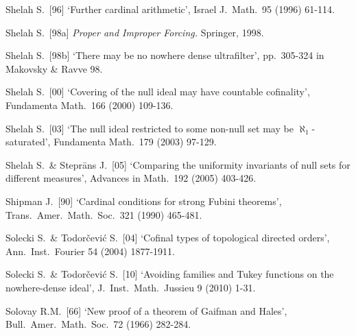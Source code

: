 {Shelah S.\ [96] `Further cardinal arithmetic', Israel J.\ Math.\ 95
(1996) 61-114.
\cmmnt{[542I.]}

Shelah S.\ [98a] {\it Proper and Improper Forcing.}  Springer, 1998.

Shelah S.\ [98b] `There may be no nowhere dense ultrafilter', pp.\ 305-324
in {\smc Makovsky \& Ravve 98}.
\cmmnt{[538H, \S538 {\it notes\/}.]}


Shelah S.\ [00] `Covering of the null ideal may have countable
cofinality', Fundamenta Math.\ 166 (2000) 109-136.
\cmmnt{[\S522 {\it notes\/}.]}

Shelah S.\ [03] `The null ideal restricted to some non-null set may be
$\aleph_1$-saturated',  Fundamenta Math.\ 179 (2003) 97-129.
\cmmnt{[\S547 {\it notes\/}.]}


Shelah S.\ \& Stepr\=ans J.\ [05]
`Comparing the uniformity invariants of null sets for different measures',
Advances in Math.\ 192 (2005) 403-426.
\cmmnt{[534Za.]}


Shipman J.\ [90] `Cardinal conditions for strong Fubini
theorems', Trans.\ Amer.\ Math.\ Soc.\ 321 (1990) 465-481.
\cmmnt{[537K.]}


Solecki S.\ \& Todor\v{c}evi\'c S.\ [04]
`Cofinal types of topological directed orders',
Ann.\ Inst.\ Fourier 54 (2004) 1877-1911.
\cmmnt{[513K, 513O, 513Yi.]}

Solecki S.\ \& Todor\v{c}evi\'c S.\ [10]
`Avoiding families and Tukey functions on the nowhere-dense ideal',
J.\ Inst.\ Math.\ Jussieu 9 (2010) 1-31.
\cmmnt{[526L.]}

Solovay R.M.\ [66] `New proof of a theorem of Gaifman and Hales',
Bull.\ Amer.\ Math.\ Soc.\ 72 (1966) 282-284.
\cmmnt{[514Xi.]}

}
